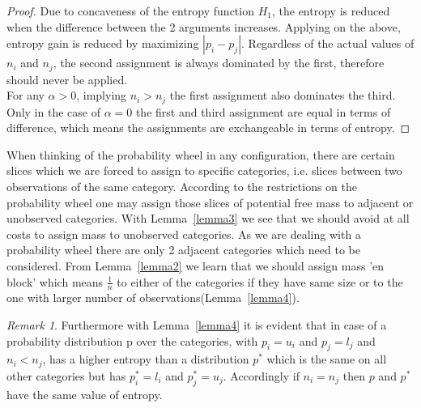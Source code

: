 \documentclass[a4paper]{article}
\theoremstyle{definition} \newtheorem{lemma}{Lemma}
\theoremstyle{remark} \newtheorem{remark}{Remark}
\begin{document}
\begin{proof}
Due to concaveness of the entropy function $H_1$, the entropy is reduced when the difference between the 2 arguments increases. Applying on the above, entropy gain is reduced by maximizing $|p_i - p_j|$.
Regardless of the actual values of $n_i$ and $n_j$, the second assignment is always dominated by the first, therefore should never be applied.\\
For any $\alpha > 0$, implying $n_i > n_j$ the first assignment also dominates the third. Only in the case of $\alpha = 0$ the first and third assignment are equal in terms of difference, which means the assignments are exchangeable in terms of entropy.
\end{proof}

When thinking of the probability wheel in any configuration, there are certain slices which we are forced to assign to specific categories, i.e. slices between two observations of the same category. According to the restrictions on the probability wheel one may assign those slices of potential free mass to adjacent or unobserved categories. With Lemma~\ref{lemma3} we see that we should avoid at all costs to assign mass to unobserved categories. As we are dealing with a probability wheel there are only 2 adjacent categories which need to be considered. From Lemma~\ref{lemma2} we learn that we should assign mass 'en block' which means $\frac{1}{n}$ to either of the categories if they have same size or to the one with larger number of observations(Lemma~\ref{lemma4}). 

\begin{remark}
\label{remark1}
Furthermore with Lemma~\ref{lemma4} it is evident that in case of a probability distribution p over the categories, with $p_i = u_i$ and $p_j = l_j$ and $n_i<n_j$, has a higher entropy than a distribution $p^*$ which is the same on all other categories but has $p^*_i = l_i$ and $p^*_j = u_j$. Accordingly if $n_i=n_j$ then $p$ and $p^*$ have the same value of entropy. 
\end{remark}
\end{document}
